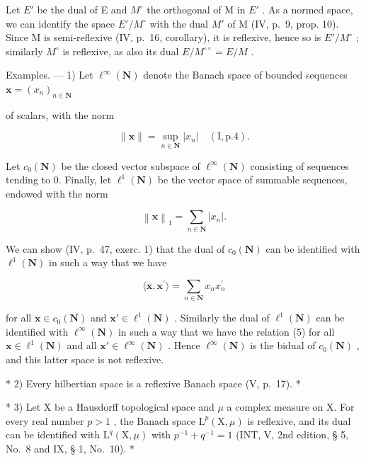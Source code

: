 Let \(E'\) be the dual of E and \(M^{\circ}\) the orthogonal of M in \(E'\) . As a normed space, we can identify the space \(E'/M^{\circ}\) with the dual \(M'\) of M (IV, p.~9, prop. 10). Since M is semi-reflexive (IV, p.~16, corollary), it is reflexive, hence so is \(E'/M^{\circ}\) ; similarly \(M^{\circ}\) is reflexive, as also its dual \(E/M^{\circ\circ} = E/M\) .

Examples. --- 1) Let \(\ell^{\infty}(\mathbf{N})\) denote the Banach space of bounded sequences \(\mathbf{x} = (x_n)_{n\in \mathbf{N}}\)

of scalars, with the norm

\[
\| \mathbf {x} \| = \sup _ {n \in \mathbf {N}} | x _ {n} | \quad (\mathrm{I}, \text {p.} 4).\tag{3}
\]

Let \(c_{0}(\mathbf{N})\) be the closed vector subspace of \(\ell^{\infty}(\mathbf{N})\) consisting of sequences tending to 0. Finally, let \(\ell^{1}(\mathbf{N})\) be the vector space of summable sequences, endowed with the norm

\[
\left\| \mathbf {x} \right\| _ {1} = \sum_ {n \in \mathbf {N}} \left| x _ {n} \right|.\tag{4}
\]

We can show (IV, p.~47, exerc. 1) that the dual of \(c_0(\mathbf{N})\) can be identified with \(\ell^1 (\mathbf{N})\) in such a way that we have

\[
\langle \mathbf {x}, \mathbf {x} ^ {\prime} \rangle = \sum_ {n \in \mathbf {N}} x _ {n} x _ {n} ^ {\prime}\tag{5}
\]

for all \(\mathbf{x} \in c_0(\mathbf{N})\) and \(\mathbf{x}' \in \ell^1(\mathbf{N})\) . Similarly the dual of \(\ell^1(\mathbf{N})\) can be identified with \(\ell^\infty(\mathbf{N})\) in such a way that we have the relation (5) for all \(\mathbf{x} \in \ell^1(\mathbf{N})\) and all \(\mathbf{x}' \in \ell^\infty(\mathbf{N})\) . Hence \(\ell^\infty(\mathbf{N})\) is the bidual of \(c_0(\mathbf{N})\) , and this latter space is not reflexive.

* 2) Every hilbertian space is a reflexive Banach space (V, p.~17). *

* 3) Let X be a Hausdorff topological space and \(\mu\) a complex measure on X. For every real number \(p > 1\) , the Banach space \(\mathrm{L}^p (\mathrm{X},\mu)\) is reflexive, and its dual can be identified with \(\mathrm{L}^q (\mathrm{X},\mu)\) with \(p^{-1} + q^{-1} = 1\) (INT, V, 2nd edition, § 5, No.~8 and IX, § 1, No.~10). *

